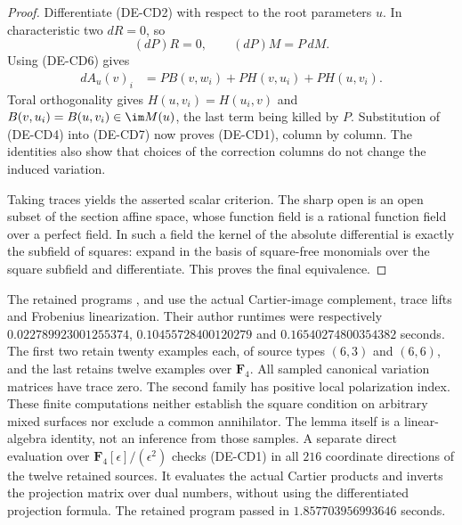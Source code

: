 \begin{proof}
Differentiate (DE-CD2) with respect to the root parameters $u$.
In characteristic two $dR=0$, so
\[
                  (dP)R=0,\qquad(dP)M=P\,dM.
\]
Using (DE-CD6) gives
\[
 \begin{aligned}
 dA_u(v)_i
 &=P B(v,w_i)+P H(v,u_i)+P H(u,v_i).
 \end{aligned}
                                                        \tag{DE-CD8}
\]
Toral orthogonality gives $H(u,v_i)=H(u_i,v)$ and
$B(v,u_i)=B(u,v_i)\in\im M(u)$, the last term being killed by $P$.
Substitution of (DE-CD4) into (DE-CD7) now proves (DE-CD1), column by
column. The identities also show that choices of the correction
columns do not change the induced variation.

Taking traces yields the asserted scalar criterion. The sharp open
is an open subset of the section affine space, whose function field
is a rational function field over a perfect field. In such a field
the kernel of the absolute differential is exactly the subfield of
squares: expand in the basis of square-free monomials over the square
subfield and differentiate. This proves the final equivalence.
\end{proof}

\begin{remark}
\label{rem:DE-A3-positive-cup-derivative-scope-candidate}
The retained programs
,
and
use the actual Cartier-image complement, trace lifts and Frobenius
linearization. Their author runtimes were respectively
$0.022789923001255374$, $0.10455728400120279$ and
$0.16540274800354382$ seconds. The first two retain twenty examples
each, of source types $(6,3)$ and $(6,6)$, and the last retains twelve
examples over $\mathbf F_4$. All sampled canonical variation matrices
have trace zero. The second family has positive local polarization
index. These finite computations neither establish the square
condition on arbitrary mixed surfaces nor exclude a common
annihilator. The lemma itself is a linear-algebra identity, not an
inference from those samples.
A separate direct evaluation over $\mathbf F_4[\epsilon]/(\epsilon^2)$
checks (DE-CD1) in all $216$ coordinate directions of the twelve retained
sources. It evaluates the actual Cartier products and inverts the
projection matrix over dual numbers, without using the differentiated
projection formula. The retained program
passed in $1.857703956993646$ seconds.
\end{remark}
